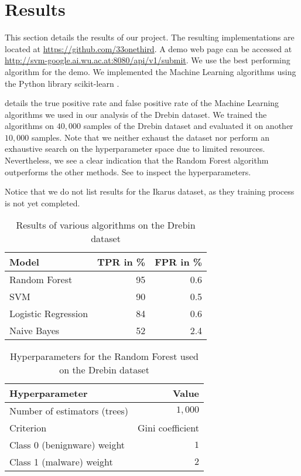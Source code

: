 \section{Results}
This section details the results of our project. The resulting implementations are located at \url{https://github.com/33onethird}. A demo web page can be accessed at \url{http://svm-google.ai.wu.ac.at:8080/api/v1/submit}. We use the best performing algorithm for the demo. We implemented the Machine Learning algorithms using the Python library scikit-learn \cite{scikit-learn}.

 details the true positive rate and false positive rate of the Machine Learning algorithms we used in our analysis of the Drebin dataset. We trained the algorithms on $40,000$ samples of the Drebin dataset and evaluated it on another $10,000$ samples. Note that we neither exhaust the dataset nor perform an exhaustive search on the hyperparameter space due to limited resources. Nevertheless, we see a clear indication that the Random Forest algorithm outperforms the other methods. See  to inspect the hyperparameters.

Notice that we do not list results for the Ikarus dataset, as they training process is not yet completed.
\begin{table}[p]
	\centering
	\begin{tabular}{l r r}
		Model & TPR in \% & FPR in \%\\
		\hline
		Random Forest & 95 & 0.6\\
		SVM & 90 & 0.5\\
		Logistic Regression & 84 & 0.6\\
		Naive Bayes & 52 & 2.4\\
		\hline
	\end{tabular}
	\caption{Results of various algorithms on the Drebin dataset}
	\label{tab:resdreb}
\end{table}

\begin{table}[p]
	\centering
	\begin{tabular}{l r}
		Hyperparameter & Value \\
		\hline
		Number of estimators (trees) & $1,000$\\
		Criterion & Gini coefficient\\
		Class 0 (benignware) weight & $1$\\
		Class 1 (malware) weight & $2$\\
		\hline
	\end{tabular}
	\caption{Hyperparameters for the Random Forest used on the Drebin dataset}
	\label{tab:rfdrebin}
\end{table}

